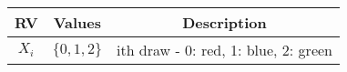 
\begin{center}
\begin{tabular}{|c|c|c|}
\hline
\textbf{RV}& \textbf{Values} & \textbf{Description} \\ \hline
$X_i$		   & 	$\{0,1,2\}$	&  ith draw - 0: red, 1: blue, 2: green\\ \hline
\end{tabular}
\end{center}
